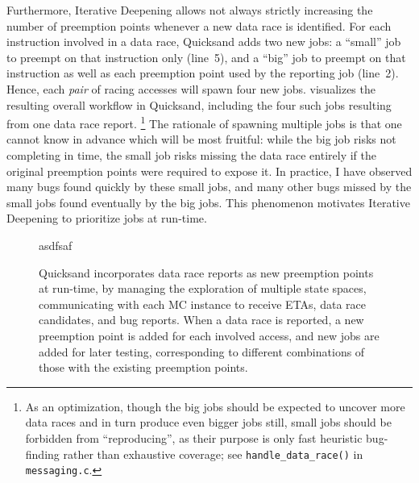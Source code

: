 Furthermore,
Iterative Deepening allows not always strictly increasing the number of preemption points
whenever a new data race is identified.
For each instruction involved in a data race, Quicksand adds two new jobs:
a ``small'' job to preempt on that instruction only (line~5),
and a ``big'' job to preempt on that instruction as well as each preemption point used by the reporting job (line~2).
%
Hence,
each {\em pair} of racing accesses will spawn four new jobs.
 visualizes the resulting overall workflow in Quicksand,
including the four such jobs resulting from one data race report.%
\footnote{As an optimization,
though the big jobs should be expected to uncover more data races and in turn
produce even bigger jobs still,
small jobs should be forbidden from ``reproducing'',
as their purpose is only fast heuristic bug-finding rather than exhaustive coverage;
see {\tt handle\_data\_race()} in {\tt messaging.c}.}
%
The rationale of spawning multiple jobs is that one cannot know in advance which will be most fruitful:
while the big job risks not completing in time,
the small job risks missing the data race entirely if the original preemption points were required to expose it.
In practice, I have observed many bugs found quickly by these small jobs,
and many other bugs missed by the small jobs found eventually by the big jobs.
This phenomenon motivates Iterative Deepening to prioritize jobs at run-time.

\begin{figure}[t]
        asdfsaf
	\caption[Quicksand incorporates data race reports as new preemption points at run-time.]
		{Quicksand incorporates data race reports as new preemption points at run-time,
		by managing the exploration of multiple state spaces,
		communicating with each MC instance to receive ETAs, data race candidates, and bug reports.
                When a data race is reported,
                a new preemption point is added for each involved access,
                and new jobs are added for later testing,
                corresponding to different combinations of those with the existing preemption points.}
        \label{fig:new-dr-jobs}
\end{figure}

